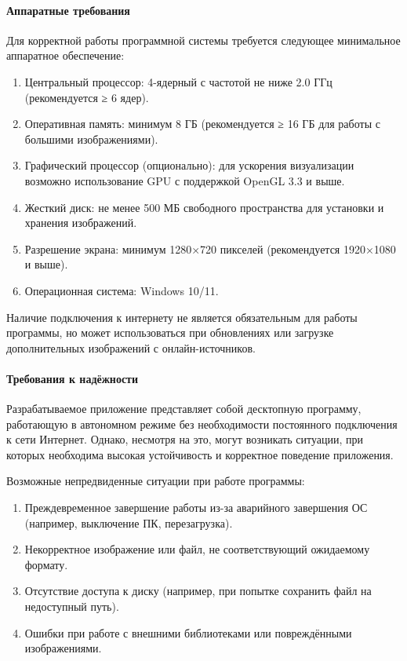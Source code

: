 \paragraph{Аппаратные требования}

Для корректной работы программной системы требуется следующее минимальное аппаратное обеспечение:
\begin{enumerate}
	\item Центральный процессор: 4-ядерный с частотой не ниже 2.0 ГГц (рекомендуется ≥ 6 ядер).
	\item Оперативная память: минимум 8 ГБ (рекомендуется ≥ 16 ГБ для работы с большими изображениями).
	\item Графический процессор (опционально): для ускорения визуализации возможно использование GPU с поддержкой OpenGL 3.3 и выше.
	\item Жесткий диск: не менее 500 МБ свободного пространства для установки и хранения изображений.
	\item Разрешение экрана: минимум 1280×720 пикселей (рекомендуется 1920×1080 и выше).
	\item Операционная система: Windows 10/11.
\end{enumerate}

Наличие подключения к интернету не является обязательным для работы программы, но может использоваться при обновлениях или загрузке дополнительных изображений с онлайн-источников.
\paragraph{Требования к надёжности}

Разрабатываемое приложение представляет собой десктопную программу, работающую в автономном режиме без необходимости постоянного подключения к сети Интернет. Однако, несмотря на это, могут возникать ситуации, при которых необходима высокая устойчивость и корректное поведение приложения.

Возможные непредвиденные ситуации при работе программы:
\begin{enumerate}
	\item Преждевременное завершение работы из-за аварийного завершения ОС (например, выключение ПК, перезагрузка).
	\item Некорректное изображение или файл, не соответствующий ожидаемому формату.
	\item Отсутствие доступа к диску (например, при попытке сохранить файл на недоступный путь).
	\item Ошибки при работе с внешними библиотеками или повреждёнными изображениями.
\end{enumerate}

